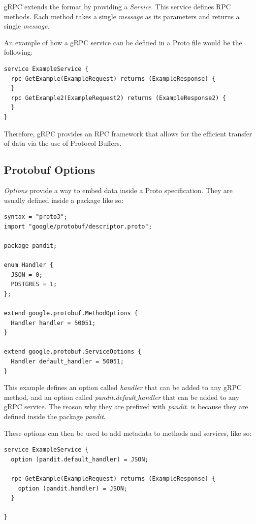 \documentclass[a4paper,12pt]{report}
\begin{document}
gRPC extends the \textit{} format by providing a \textit{Service}. This service defines RPC methods. 
Each method takes a single \textit{message} as its parameters and returns a single \textit{message}.

An example of how a gRPC service can be defined in a Proto file would be the following:

\begin{lstlisting}
service ExampleService {
  rpc GetExample(ExampleRequest) returns (ExampleResponse) {
  }
  rpc GetExample2(ExampleRequest2) returns (ExampleResponse2) {
  }
}
\end{lstlisting}

Therefore, gRPC provides an RPC framework that allows for the efficient transfer of data via the use of Protocol Buffers.

\subsection{Protobuf Options}
\label{sec:options}
\textit{Options} provide a way to embed data inside a Proto specification. They are usually defined inside a package like so:
\begin{lstlisting}
syntax = "proto3";
import "google/protobuf/descriptor.proto";

package pandit;

enum Handler {
  JSON = 0;
  POSTGRES = 1;
};

extend google.protobuf.MethodOptions { 
  Handler handler = 50051; 
}

extend google.protobuf.ServiceOptions { 
  Handler default_handler = 50051; 
}
\end{lstlisting}

This example defines an option called \textit{handler} that can be added to any gRPC method, and an option called \textit{pandit.default$\_$handler} 
that can be added to any gRPC service. The reason why they are prefixed with \textit{pandit.} is because they are defined inside the package \textit{pandit}.

These options can then be used to add metadata to methods and services, like so:

\begin{lstlisting}
service ExampleService {
  option (pandit.default_handler) = JSON;

  rpc GetExample(ExampleRequest) returns (ExampleResponse) {
    option (pandit.handler) = JSON;
  }
  
}
\end{lstlisting}
\end{document}
